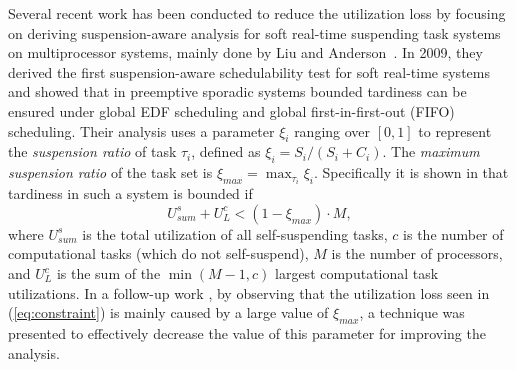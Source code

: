 Several recent work has been conducted to reduce the utilization loss by focusing on deriving suspension-aware analysis for soft real-time suspending task systems on multiprocessor systems, mainly done by Liu and Anderson~\cite{Liu3,Liu4,Liu5,Liu9,Liu11}. 
In 2009, they derived the first suspension-aware schedulability test for soft real-time systems~\cite{Liu3} and showed that in preemptive sporadic systems bounded tardiness can be ensured under global EDF scheduling and global first-in-first-out (FIFO) scheduling. Their analysis uses a parameter $\xi_i$ ranging over $[0,1]$ to represent the \textit{suspension ratio} of task $\tau_i$, defined as $\xi_i = S_i/(S_i+C_i)$. The \emph{maximum suspension ratio} of the task set is $\xi_{max}=\max_{\tau_i} \xi_i$.
Specifically it is shown in \cite{Liu3} that tardiness in such a system is bounded if 
\begin{equation}\label{eq:constraint} U_{sum}^s + U_L^c < (1-\xi_{max}) \cdot M , \end{equation}
where $U_{sum}^s$ is the total utilization of all self-suspending tasks, $c$ is the number of computational tasks (which do not self-suspend), $M$ is the number of processors, and $U_L^c$ is the sum of the $\min(M-1,c)$ largest computational task utilizations.
In a follow-up work \cite{Liu5}, by observing that the utilization loss seen in (\ref{eq:constraint}) is mainly caused by a large value of $\xi_{max}$, a technique was presented to effectively decrease the value of this parameter for improving the analysis. 
